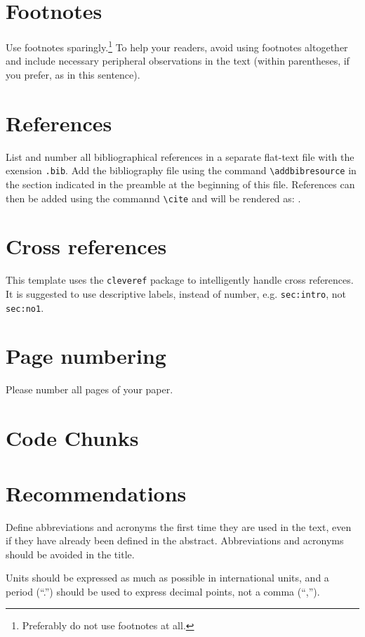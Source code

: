 \documentclass[10pt,a4paper,twocolumn]{article}
\begin{document}
\section{Footnotes}
\label{sec:footnotes}
Use footnotes sparingly.\footnote{Preferably do not use footnotes at all.}
To help your readers, avoid using footnotes altogether and include necessary peripheral observations in the text (within parentheses, if you prefer, as in this sentence).


\section{References}
\label{sec:references}
List and number all bibliographical references in a separate flat-text file with the exension \texttt{.bib}.
Add the bibliography file using the command \texttt{{\textbackslash addbibresource}} in the section indicated in the preamble at the beginning of this file.
References can then be added using the commannd \texttt{\textbackslash cite} and will be rendered as: \cite{wiegand2019WHO}.


\section{Cross references}
\label{sec:cross-references}
This template uses the \texttt{cleveref} package to intelligently handle cross references.
It is suggested to use descriptive labels, instead of number, e.g. \texttt{sec:intro}, not \texttt{sec:no1}.


\section{Page numbering}
\label{sec:numbering}
Please number all pages of your paper.


\section{Code Chunks}
\label{sec:code-chunks}


\section{Recommendations}
\label{sec:recommendations}
Define abbreviations and acronyms the first time they are used in the text, even if they have already been defined in the abstract.
Abbreviations and acronyms should be avoided in the title.

Units should be expressed as much as possible in international units, and a period (``.'') should be used to express decimal points, not a comma (``,'').
\end{document}
